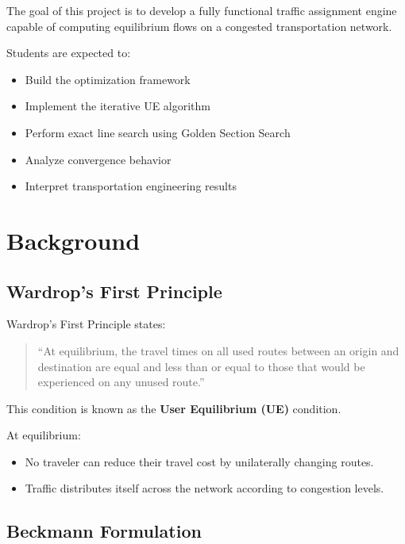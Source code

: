 \documentclass{rapportCS} %
\begin{document}
The goal of this project is to develop a fully functional traffic assignment engine capable of computing equilibrium flows on a congested transportation network.

\vspace{0.5em}

Students are expected to:
\begin{itemize}
    \item Build the optimization framework
    \item Implement the iterative UE algorithm
    \item Perform exact line search using Golden Section Search
    \item Analyze convergence behavior
    \item Interpret transportation engineering results
\end{itemize}

\section{Background}

\subsection{Wardrop's First Principle}

Wardrop's First Principle states:

\begin{quote}
``At equilibrium, the travel times on all used routes between an origin and destination are equal and less than or equal to those that would be experienced on any unused route.''
\end{quote}

This condition is known as the \textbf{User Equilibrium (UE)} condition.

At equilibrium:
\begin{itemize}
    \item No traveler can reduce their travel cost by unilaterally changing routes.
    \item Traffic distributes itself across the network according to congestion levels.
\end{itemize}

\subsection{Beckmann Formulation}
\end{document}

